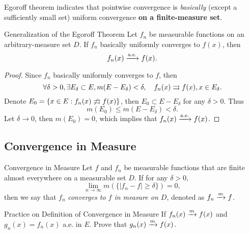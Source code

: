 \begin{note}
  Egoroff theorem indicates that pointwise convergence is
  \emph{basically} (except a sufficiently small set) uniform convergence
  \textbf{on a finite-measure set}.
\end{note}

\begin{example}{Generalization of the Egoroff Theorem}{}
  Let $f_n$ be measurable functions on an arbitrary-measure set $D$.
  If $f_n$ basically uniformly converges to $f(x)$, then
  \begin{equation}
    f_n(x) \xrightarrow{\text{a.e.}} f(x).
  \end{equation}
\end{example}

\begin{proof}
  Since $f_n$ basically uniformly converges to $f$, then
  \begin{equation}
    \forall \delta > 0, \exists E_{\delta} \subset E, m(E - E_{\delta}) < \delta,
    \quad f_n(x) \rightrightarrows f(x), x \in E_{\delta}.
  \end{equation}
  Denote $E_0 = \{x \in E: f_n(x) \not \rightrightarrows f(x)\}$, then $E_0 \subset E - E_{\delta}$ for any $\delta > 0$.
  Thus
  \begin{equation}
    m(E_0) \leq m(E - E_{\delta}) < \delta.
  \end{equation}
  Let $\delta \rightarrow 0$, then $m(E_0) = 0$, which implies that $f_n(x) \xrightarrow{\text{a.e.}} f(x)$.
\end{proof}

\subsection{Convergence in Measure}

\begin{definition}{Convergence in Measure}{}
  Let $f$ and $f_n$ be measurable functions that are finite almost everywhere on
  a measurable set $D$. If for any $\delta > 0$,
  \begin{equation}
    \lim \limits _{n \rightarrow \infty} m(\{|f_n - f| \geq \delta\}) = 0,
  \end{equation}
  then we say that $f_n$ \emph{converges to $f$ in measure on $D$},
  denoted as $f_n \xrightarrow{m} f$.
\end{definition}

\begin{example}{Practice on Definition of Convergence in Measure}{}
  If $f_n(x) \xrightarrow{m} f(x)$ and $g_n(x) = f_n(x)$ a.e. in $E$.
  Prove that $g_n(x) \xrightarrow{m} f(x)$.
\end{example}

